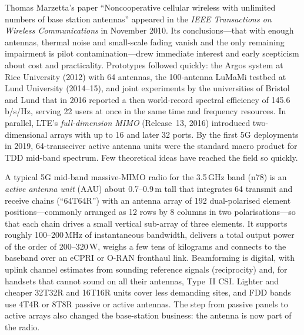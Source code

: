 
\begin{history}
Thomas Marzetta's paper ``Noncooperative cellular wireless with unlimited numbers of base station
antennas'' appeared in the \emph{IEEE Transactions on Wireless Communications} in November 2010. Its
conclusions---that with enough antennas, thermal noise and small-scale fading vanish and the only
remaining impairment is pilot contamination---drew immediate interest and early scepticism about
cost and practicality. Prototypes followed quickly: the Argos system at Rice University (2012) with
64 antennas, the 100-antenna LuMaMi testbed at Lund University (2014--15), and joint experiments by
the universities of Bristol and Lund that in 2016 reported a then world-record spectral efficiency of
145.6\,b/s/Hz, serving 22 users at once in the same time and frequency resources. In parallel, LTE's
\emph{full-dimension MIMO} (Release~13, 2016) introduced two-dimensional arrays with up to 16 and
later 32 ports. By the first 5G deployments in 2019, 64-transceiver active antenna units were the
standard macro product for TDD mid-band spectrum. Few theoretical ideas have reached the field so
quickly.
\end{history}


\begin{inpractice}
A typical 5G mid-band massive-MIMO radio for the 3.5\,GHz band (n78) is an \emph{active antenna
unit} (AAU) about 0.7--0.9\,m tall that integrates 64 transmit and receive chains (``64T64R'') with
an antenna array of 192 dual-polarised element positions---commonly arranged as 12 rows by 8 columns
in two polarisations---so that each chain drives a small vertical sub-array of three elements. It
supports roughly 100--200\,MHz of instantaneous bandwidth, delivers a total output power of the
order of 200--320\,W, weighs a few tens of kilograms and connects to the baseband over an eCPRI or
O-RAN fronthaul link. Beamforming is digital, with uplink channel estimates from sounding reference
signals (reciprocity) and, for handsets that cannot sound on all their antennas, Type~II CSI. Lighter
and cheaper 32T32R and 16T16R units cover less demanding sites, and FDD bands use 4T4R or 8T8R
passive or active antennas. The step from passive panels to active arrays also changed the
base-station business: the antenna is now part of the radio.
\end{inpractice}

